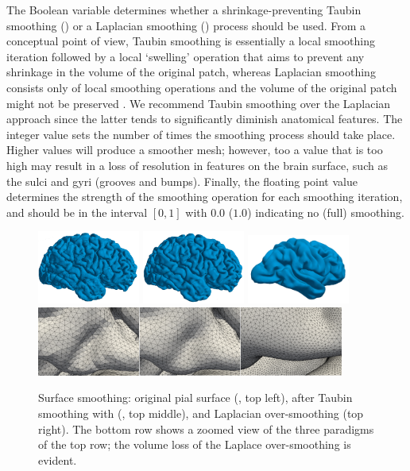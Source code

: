 The Boolean variable  determines
whether a shrinkage-preventing \cite{taubin1995curve} Taubin smoothing
() or a Laplacian smoothing ()
process should be used. From a conceptual point of view, Taubin
smoothing is essentially a local smoothing iteration followed by a
local `swelling' operation that aims to prevent any shrinkage in the
volume of the original patch, whereas Laplacian smoothing consists
only of local smoothing operations and the volume of the original
patch might not be preserved \cite{taubin1995curve}. We recommend
Taubin smoothing over the Laplacian approach since the latter tends to
significantly diminish anatomical features. The integer value
 sets the number of times the smoothing process should
take place. Higher values will produce a smoother mesh; however, too a
value that is too high may result in a loss of resolution in features
on the brain surface, such as the sulci and gyri (grooves and
bumps). Finally, the floating point value 
determines the strength of the smoothing operation for each smoothing
iteration, and should be in the interval $[0, 1]$ with $0.0$ ($1.0$)
indicating no (full) smoothing.
\begin{figure}
  \centering
  \includegraphics[width=0.30\textwidth]{./graphics/chp3/unsmoothed.png}
  \includegraphics[width=0.30\textwidth]{./graphics/chp3/taubin-smoothed-10.png}
  \includegraphics[width=0.30\textwidth]{./graphics/chp3/oversmoothing.png}\\
  \includegraphics[width=0.90\textwidth]{./graphics/chp3/smooth_zoom.png}
  \caption{Surface smoothing: original pial surface 
    (, top left), after Taubin smoothing with
    {\svmtk} (, top middle), and Laplacian over-smoothing 
    (top right). The bottom row shows a zoomed view of the three paradigms 
    of the top row; the volume loss of the Laplace over-smoothing is evident.}
  \label{fig:chp3:ernie-smoothing}
\end{figure}
